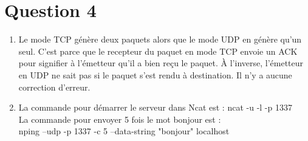 \section{Question 4}
\begin{enumerate}
	\item Le mode TCP génère deux paquets alors que le mode UDP en génère qu'un seul. C'est parce que le recepteur du paquet en mode TCP envoie un ACK pour signifier à l'émetteur qu'il a bien reçu le paquet. À l'inverse, l'émetteur en UDP ne sait pas si le paquet s'est rendu à destination. Il n'y a aucune correction d'erreur.
	\item La commande pour démarrer le serveur dans Ncat est : ncat -u -l -p 1337 \\ La commande pour envoyer 5 fois le mot bonjour est : \\ nping --udp -p 1337 -c 5 --data-string "bonjour" localhost
\end{enumerate}

